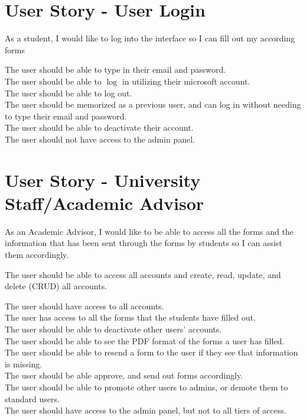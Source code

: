 \documentclass[10pt]{article}
\begin{document}
\section*{User Story - User Login}
As a student, I would like to log into the interface so I can fill out my according forms

The user should be able to type in their email and password.\\
The user should be able to $\log$ in utilizing their microsoft account.\\
The user should be able to log out.\\
The user should be memorized as a previous user, and can log in without needing to type their email and password.\\
The user should be able to deactivate their account.\\
The user should not have access to the admin panel.

\section*{User Story - University Staff/Academic Advisor}
As an Academic Advisor, I would like to be able to access all the forms and the information that has been sent through the forms by students so I can assist them accordingly.

The user should be able to access all accounts and create, read, update, and delete (CRUD) all accounts.

The user should have access to all accounts.\\
The user has access to all the forms that the students have filled out.\\
The user should be able to deactivate other users' accounts.\\
The user should be able to see the PDF format of the forms a user has filled.\\
The user should be able to resend a form to the user if they see that information is missing.\\
The user should be able approve, and send out forms accordingly.\\
The user should be able to promote other users to admins, or demote them to standard users.\\
The user should have access to the admin panel, but not to all tiers of access.
\end{document}
